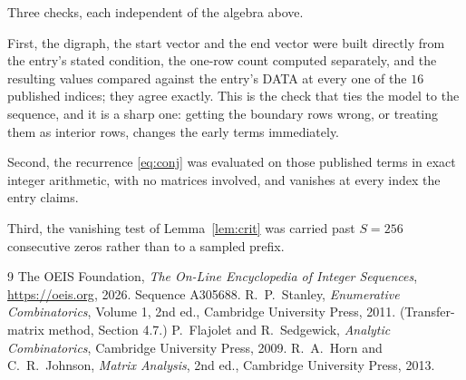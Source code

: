 \documentclass[11pt,a4paper]{article}
\theoremstyle{plain}
\theoremstyle{definition}
\begin{document}
Three checks, each independent of the algebra above.

First, the digraph, the start vector and the end vector were built directly from the
entry's stated condition, the one-row count computed separately, and the resulting values
compared against the entry's DATA at every one of the $16$ published indices; they
agree exactly. This is the check that ties the model to the sequence, and it is a sharp one:
getting the boundary rows wrong, or treating them as interior rows, changes the early terms
immediately.

Second, the recurrence \eqref{eq:conj} was evaluated on those published terms in exact
integer arithmetic, with no matrices involved, and vanishes at every index the entry claims.

Third, the vanishing test of Lemma~\ref{lem:crit} was carried past $S=256$ consecutive
zeros rather than to a sampled prefix.

\begin{thebibliography}{9}
 The OEIS Foundation, \emph{The On-Line Encyclopedia of Integer
Sequences}, \url{https://oeis.org}, 2026. Sequence A305688.
 R.~P.~Stanley, \emph{Enumerative Combinatorics}, Volume 1, 2nd ed.,
Cambridge University Press, 2011. (Transfer-matrix method, Section 4.7.)
 P.~Flajolet and R.~Sedgewick, \emph{Analytic Combinatorics}, Cambridge
University Press, 2009.
 R.~A.~Horn and C.~R.~Johnson, \emph{Matrix Analysis}, 2nd ed., Cambridge
University Press, 2013.
\end{thebibliography}
\end{document}
